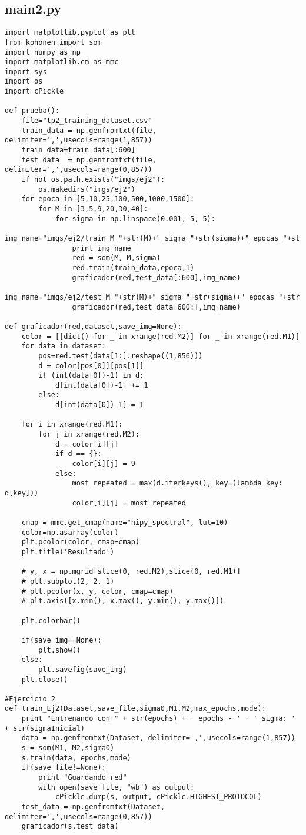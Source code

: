 \subsection{main2.py}
\begin{lstlisting}[caption=main.py]
import matplotlib.pyplot as plt
from kohonen import som
import numpy as np
import matplotlib.cm as mmc
import sys
import os
import cPickle

def prueba():
	file="tp2_training_dataset.csv"
	train_data = np.genfromtxt(file, delimiter=',',usecols=range(1,857))
	train_data=train_data[:600]
	test_data  = np.genfromtxt(file, delimiter=',',usecols=range(0,857))
	if not os.path.exists("imgs/ej2"):
		os.makedirs("imgs/ej2")
	for epoca in [5,10,25,100,500,1000,1500]:
		for M in [3,5,9,20,30,40]:
			for sigma in np.linspace(0.001, 5, 5):
				img_name="imgs/ej2/train_M_"+str(M)+"_sigma_"+str(sigma)+"_epocas_"+str(epoca)+".png"
				print img_name
				red = som(M, M,sigma)
				red.train(train_data,epoca,1)
				graficador(red,test_data[:600],img_name)
				img_name="imgs/ej2/test_M_"+str(M)+"_sigma_"+str(sigma)+"_epocas_"+str(epoca)+".png"
				graficador(red,test_data[600:],img_name)

def graficador(red,dataset,save_img=None):
	color = [[dict() for _ in xrange(red.M2)] for _ in xrange(red.M1)]
	for data in dataset:
		pos=red.test(data[1:].reshape((1,856)))
		d = color[pos[0]][pos[1]]
		if (int(data[0])-1) in d:
			d[int(data[0])-1] += 1
		else:
			d[int(data[0])-1] = 1

	for i in xrange(red.M1):
		for j in xrange(red.M2):
			d = color[i][j]
			if d == {}:
				color[i][j] = 9
			else:
				most_repeated = max(d.iterkeys(), key=(lambda key: d[key]))
				color[i][j] = most_repeated

	cmap = mmc.get_cmap(name="nipy_spectral", lut=10)
	color=np.asarray(color)
	plt.pcolor(color, cmap=cmap)
	plt.title('Resultado')

	# y, x = np.mgrid[slice(0, red.M2),slice(0, red.M1)]
	# plt.subplot(2, 2, 1)
	# plt.pcolor(x, y, color, cmap=cmap)
	# plt.axis([x.min(), x.max(), y.min(), y.max()])

	plt.colorbar()

	if(save_img==None):
		plt.show()
	else:
		plt.savefig(save_img)
	plt.close() 

#Ejercicio 2
def train_Ej2(Dataset,save_file,sigma0,M1,M2,max_epochs,mode):
	print "Entrenando con " + str(epochs) + ' epochs - ' + ' sigma: ' + str(sigmaInicial) 
	data = np.genfromtxt(Dataset, delimiter=',',usecols=range(1,857))
	s = som(M1, M2,sigma0)
	s.train(data, epochs,mode)
	if(save_file!=None):
		print "Guardando red"
		with open(save_file, "wb") as output:
			cPickle.dump(s, output, cPickle.HIGHEST_PROTOCOL)
	test_data = np.genfromtxt(Dataset, delimiter=',',usecols=range(0,857))
	graficador(s,test_data)



\end{lstlisting}
